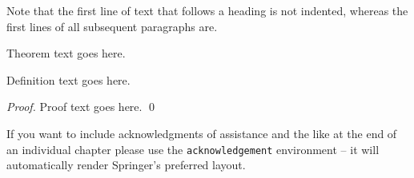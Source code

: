 Note that the first line of text that follows a heading is not indented, whereas the first lines of all subsequent paragraphs are.
%
%
\begin{theorem}
Theorem text goes here.
\end{theorem}
%
\begin{definition}
Definition text goes here.
\end{definition}
%
\begin{proof}
\smartqed
Proof text goes here.
\qed
\end{proof}
%
\begin{acknowledgement}
If you want to include acknowledgments of assistance and the like at the end of an individual chapter please use the \verb|acknowledgement| environment -- it will automatically render Springer's preferred layout.
\end{acknowledgement}



